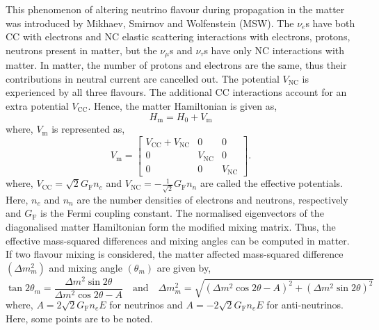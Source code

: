 This phenomenon of altering neutrino flavour during propagation in the
matter was introduced by Mikhaev, Smirnov and Wolfenstein
(MSW)\cite{msw1}. The $\nu_{e}$s have both CC with electrons and
NC elastic scattering interactions with electrons, protons, neutrons
present in matter, but the $\nu_{\mu}$s and $\nu_{\tau}$s have only NC
interactions with matter.
In matter, the number of protons and electrons are the same, thus their
contributions in neutral current are cancelled out.
The potential $V_{\textrm{NC}}$ is experienced by all three flavours.
The additional CC interactions account for an extra potential
$V_{\textrm{CC}}$. Hence, the matter Hamiltonian is given as,
\begin{equation}
  H_{\mathrm{m}} = H_{0}+V_{\mathrm{m}}
\end{equation}
where, $V_{\mathrm{m}}$ is represented as,
\begin{equation}
  V_{\mathrm{m}} =
  \begin{bmatrix}
    V_{\textrm{CC}} + V_{\textrm{NC}} & 0 & 0 \\
    0 & V_{\textrm{NC}} & 0 \\
    0 & 0 & V_{\textrm{NC}}
  \end{bmatrix}.
\end{equation}
where, $V_{\textrm{CC}} = \sqrt{2}G_{\mathrm{F}}n_{e}$ and
$V_{\textrm{NC}} = -\frac{1}{\sqrt{2}}G_{\mathrm{F}}n_{n}$ are called the
effective potentials. Here, $n_{e}$ and $n_{n}$ are the number densities
of electrons and neutrons, respectively and $G_{\mathrm{F}}$ is the
Fermi coupling constant.
The normalised eigenvectors of the diagonalised matter Hamiltonian
form the modified mixing matrix. Thus, the effective mass-squared
differences and mixing angles can be computed in matter. If two
flavour mixing is considered, the matter affected mass-squared
difference $\left(\Delta m^{2}_{m}\right)$ and
mixing angle $\left(\theta_{m}\right)$ are given by,
\begin{equation}
  \tan 2\theta_{m}=\frac{\Delta m^{2}\sin 2\theta}{\Delta m^{2}\cos 2\theta -A} \quad\text{and}\quad \Delta m^{2}_{m} = \sqrt{\left(\Delta m^{2}\cos 2\theta -A\right)^{2} + \left(\Delta m^{2}\sin 2\theta\right)^{2}} \label{eq:mattermass}
\end{equation}
where, $A=2\sqrt{2}G_{\mathrm{F}}n_{e}E$ for neutrinos and
$A=-2\sqrt{2}G_{\mathrm{F}}n_{e}E$ for anti-neutrinos. Here, some points are to
be noted.
